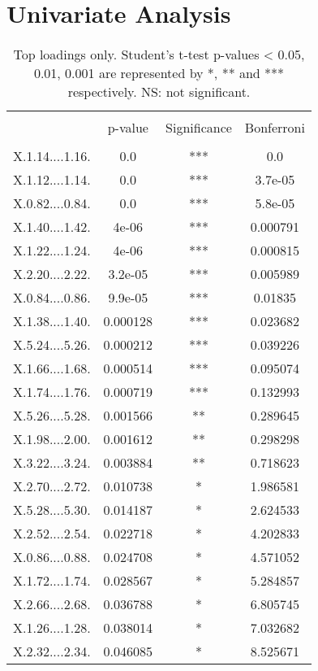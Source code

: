 \documentclass[]{article}
\begin{document}
\newpage

\section*{Univariate Analysis}

    \begin{longtable}{ c c c c }
    \caption{Top loadings only. Student's t-test p-values < 0.05, 0.01, 0.001 are represented by *, ** and 
    *** respectively. NS: not significant.} \label{tab:long} \\
    \hline \\
        & p-value & Significance & Bonferroni \\
    \hline \\
    \endfirsthead
    \endhead
    X.1.14....1.16. & 0.0 & *** & 0.0\\
X.1.12....1.14. & 0.0 & *** & 3.7e-05\\
X.0.82....0.84. & 0.0 & *** & 5.8e-05\\
X.1.40....1.42. & 4e-06 & *** & 0.000791\\
X.1.22....1.24. & 4e-06 & *** & 0.000815\\
X.2.20....2.22. & 3.2e-05 & *** & 0.005989\\
X.0.84....0.86. & 9.9e-05 & *** & 0.01835\\
X.1.38....1.40. & 0.000128 & *** & 0.023682\\
X.5.24....5.26. & 0.000212 & *** & 0.039226\\
X.1.66....1.68. & 0.000514 & *** & 0.095074\\
X.1.74....1.76. & 0.000719 & *** & 0.132993\\
X.5.26....5.28. & 0.001566 & ** & 0.289645\\
X.1.98....2.00. & 0.001612 & ** & 0.298298\\
X.3.22....3.24. & 0.003884 & ** & 0.718623\\
X.2.70....2.72. & 0.010738 & * & 1.986581\\
X.5.28....5.30. & 0.014187 & * & 2.624533\\
X.2.52....2.54. & 0.022718 & * & 4.202833\\
X.0.86....0.88. & 0.024708 & * & 4.571052\\
X.1.72....1.74. & 0.028567 & * & 5.284857\\
X.2.66....2.68. & 0.036788 & * & 6.805745\\
X.1.26....1.28. & 0.038014 & * & 7.032682\\
X.2.32....2.34. & 0.046085 & * & 8.525671\\

\end{longtable}
\end{document}

